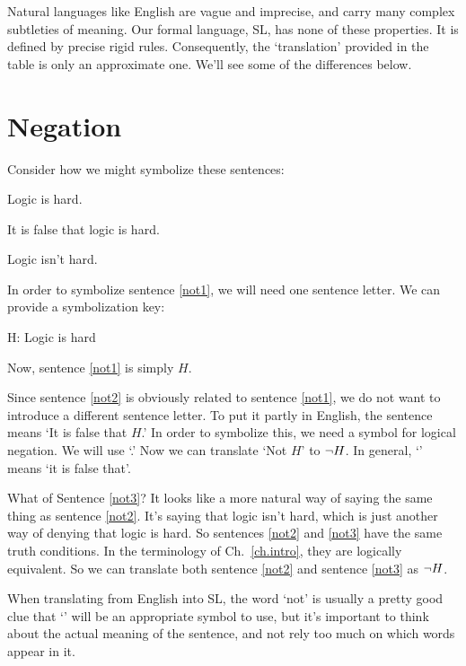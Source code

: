 Natural languages like English are vague and imprecise, and carry many complex subtleties of meaning. Our formal language, SL, has none of these properties. It is defined by precise rigid rules. Consequently, the `translation' provided in the table is only an approximate one. We'll see some of the differences below.

\section{Negation}
Consider how we might symbolize these sentences:
\begin{earg}
\item[\ex{not1}] Logic is hard.
\item[\ex{not2}] It is false that logic is hard.
\item[\ex{not3}] Logic isn't hard.
\end{earg}

In order to symbolize sentence \ref{not1}, we will need one sentence letter. We can provide a symbolization key:

\begin{ekey}
\item[H:]Logic is hard
\end{ekey}

Now, sentence \ref{not1} is simply $H$. 

Since sentence \ref{not2} is obviously related to sentence \ref{not1}, we do not want to introduce a different sentence letter. To put it partly in English, the sentence means `It is false that $H$.' In order to symbolize this, we need a symbol for logical negation. We will use `\enot.' Now we can translate `Not $H$' to $\neg H$. In general, `\enot' means `it is false that'.

What of Sentence \ref{not3}? It looks like a more natural  way of saying the same thing as sentence \ref{not2}. It's saying that logic isn't hard, which is just another way of denying that logic is hard. So sentences \ref{not2} and \ref{not3} have the same truth conditions. In the terminology of Ch.\ \ref{ch.intro}, they are logically equivalent.
So we can translate both sentence \ref{not2} and sentence \ref{not3} as $\neg H$.

When translating from English into SL, the word `not' is usually a pretty good clue that `\enot' will be an appropriate symbol to use, but it's important to think about the actual meaning of the sentence, and not rely too much on which words appear in it.

